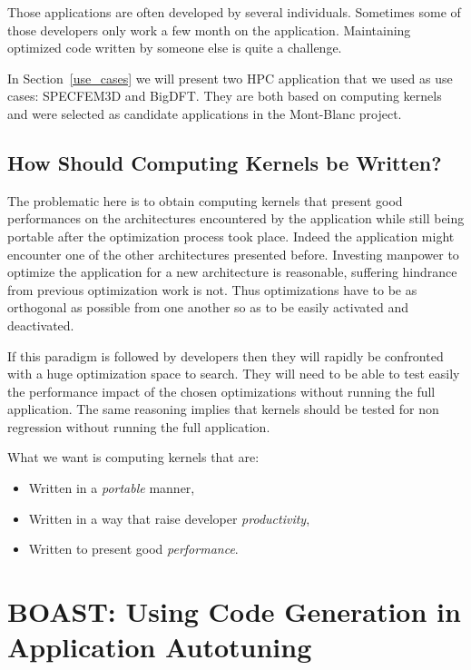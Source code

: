 \documentclass[review]{elsarticle}
\begin{document}
Those applications are often developed by several individuals. Sometimes some of
those developers only work a few month on the application. Maintaining optimized
code written by someone else is quite a challenge.

In Section~\ref{use_cases} we will present two HPC application that we used
as use cases: SPECFEM3D and BigDFT. They are both based on computing
kernels and were selected as candidate applications in the Mont-Blanc project.

  \subsection{How Should Computing Kernels be Written?}

The problematic here is to obtain computing kernels that present good
performances on the architectures encountered by the application while still
being portable after the optimization process took place. Indeed the application
might encounter one of the other architectures presented before. Investing
manpower to optimize the application for a new architecture is reasonable,
suffering hindrance from previous optimization work is not. Thus optimizations
have to be as orthogonal as possible from one another so as to be easily
activated and deactivated.

If this paradigm is followed by developers then they will rapidly be confronted
with a huge optimization space to search. They will need to be able to test
easily the performance impact of the chosen optimizations without running the
full application. The same reasoning implies that kernels should be tested for
non regression without running the full application.

What we want is computing kernels that are:
\begin{itemize}
\item Written in a \emph{portable} manner,
\item Written in a way that raise developer \emph{productivity},
\item Written to present good \emph{performance}.
\end{itemize}

\section{BOAST: Using Code Generation in Application Autotuning}
\end{document}
